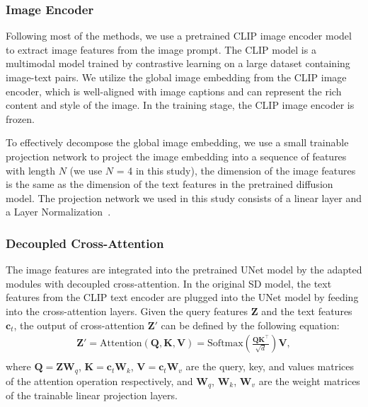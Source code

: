 \documentclass{article}
\begin{document}
\subsubsection{Image Encoder}
Following most of the methods, we use a pretrained CLIP image encoder model to extract image features from the image prompt. The CLIP model is a multimodal model trained by contrastive learning on a large dataset containing image-text pairs. We utilize the global image embedding from the CLIP image encoder, which is well-aligned with image captions and can represent the rich content and style of the image. In the training stage, the CLIP image encoder is frozen.

To effectively decompose the global image embedding, we use a small trainable projection network to project the image embedding into a sequence of features with length $N$ (we use $N$ = 4 in this study), the dimension of the image features is the same as the dimension of the text features in the pretrained diffusion model. The projection network we used in this study consists of a linear layer and a Layer Normalization~\cite{ba2016layer}. 
\subsubsection{Decoupled Cross-Attention}
The image features are integrated into the pretrained UNet model by the adapted modules with decoupled cross-attention. In the original SD model, the text features from the CLIP text encoder are plugged into the UNet model by feeding into the cross-attention layers. Given the query features $\mathbf{Z}$ and the text features $\boldsymbol{c}_{t}$, the output of cross-attention $\mathbf{Z}'$ can be defined by the following equation:
\begin{equation}
\begin{split}
\mathbf{Z}'=\text{Attention}(\mathbf{Q},\mathbf{K},\mathbf{V}) = \text{Softmax}(\frac{\mathbf{Q}\mathbf{K}^{\top}}{\sqrt{d}})\mathbf{V},
\\
\end{split}
\end{equation}
where $\mathbf{Q}=\mathbf{Z}\mathbf{W}_q$, $\mathbf{K}=\boldsymbol{c}_{t}\mathbf{W}_k$, $\mathbf{V}=\boldsymbol{c}_{t}\mathbf{W}_v$ are the query, key, and values matrices of the attention operation respectively, and $\mathbf{W}_q$, $\mathbf{W}_k$, $\mathbf{W}_v$ are the weight matrices of the trainable linear projection layers.
\end{document}

